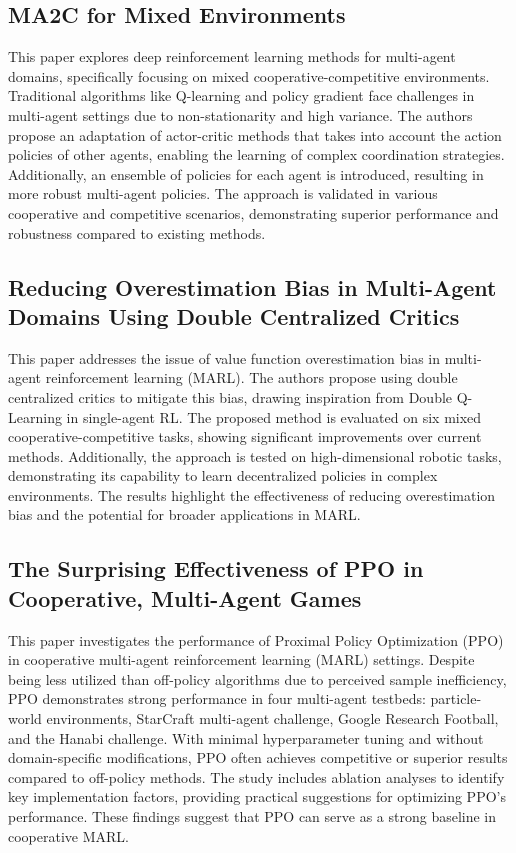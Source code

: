 \documentclass[journal]{IEEEtran}
\begin{document}
\subsection{MA2C for Mixed Environments}
This paper explores deep reinforcement learning methods for multi-agent domains, specifically focusing on mixed cooperative-competitive environments. Traditional algorithms like Q-learning and policy gradient face challenges in multi-agent settings due to non-stationarity and high variance. The authors propose an adaptation of actor-critic methods that takes into account the action policies of other agents, enabling the learning of complex coordination strategies. Additionally, an ensemble of policies for each agent is introduced, resulting in more robust multi-agent policies. The approach is validated in various cooperative and competitive scenarios, demonstrating superior performance and robustness compared to existing methods.
\cite{lowe2020}

\subsection{Reducing Overestimation Bias in Multi-Agent Domains Using Double Centralized Critics}
This paper addresses the issue of value function overestimation bias in multi-agent reinforcement learning (MARL). The authors propose using double centralized critics to mitigate this bias, drawing inspiration from Double Q-Learning in single-agent RL. The proposed method is evaluated on six mixed cooperative-competitive tasks, showing significant improvements over current methods. Additionally, the approach is tested on high-dimensional robotic tasks, demonstrating its capability to learn decentralized policies in complex environments. The results highlight the effectiveness of reducing overestimation bias and the potential for broader applications in MARL.
\cite{ackermann2019}

\subsection{The Surprising Effectiveness of PPO in Cooperative, Multi-Agent Games}
This paper investigates the performance of Proximal Policy Optimization (PPO) in cooperative multi-agent reinforcement learning (MARL) settings. Despite being less utilized than off-policy algorithms due to perceived sample inefficiency, PPO demonstrates strong performance in four multi-agent testbeds: particle-world environments, StarCraft multi-agent challenge, Google Research Football, and the Hanabi challenge. With minimal hyperparameter tuning and without domain-specific modifications, PPO often achieves competitive or superior results compared to off-policy methods. The study includes ablation analyses to identify key implementation factors, providing practical suggestions for optimizing PPO's performance. These findings suggest that PPO can serve as a strong baseline in cooperative MARL.
\cite{yu2022}
\end{document}
